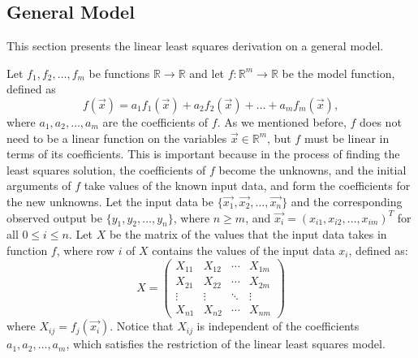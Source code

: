 \documentclass[11pt, oneside, reqno]{book}
\begin{document}




\subsection{General Model}
This section presents the linear least squares derivation on a general model.

Let $f_1, f_2, \dots, f_m$ be functions $\mathbb{R} \to \mathbb{R}$ and let $f: \mathbb{R}^m \to \mathbb{R}$ be the model function, defined as
\[
f(\vec{x}) = a_1f_1(\vec{x}) + a_2f_2(\vec{x}) + \dots + a_mf_m(\vec{x}),
\]
where $a_1, a_2, \dots, a_m$ are the coefficients of $f$.
As we mentioned before, $f$ does not need to be a linear function on the variables $\vec{x} \in \mathbb{R}^m$, but $f$ must be linear in terms of its coefficients. This is important because in the process of finding the least squares solution, the coefficients of $f$ become the unknowns, and the initial arguments of $f$ take values of the known input data, and form the coefficients for the new unknowns. Let the input data be $\{\vec{x_1}, \vec{x_2}, \dots, \vec{x_n}\}$ and the corresponding observed output be $\{y_1, y_2, \dots, y_n\}$, where $n \ge m$, and $\vec{x_i} = \left(x_{i1}, x_{i2}, \dots, x_{im}\right)^T$ for all $0 \le i \le n$. 
Let $X$ be the matrix of the values that the input data takes in function $f$, where row $i$ of $X$ contains the values of the input data $x_i$, defined as:
\[
X = \begin{pmatrix}
X_{11} & X_{12} & \cdots & X_{1m} \\
X_{21} & X_{22} & \cdots & X_{2m} \\
\vdots  & \vdots  & \ddots & \vdots  \\
X_{n1} & X_{n2} & \cdots & X_{nm}
\end{pmatrix}
\]
where $X_{ij} = f_j \left( \vec{x_i} \right) $. Notice that $X_{ij}$ is independent of the coefficients $a_1, a_2, \dots, a_m$, which satisfies the restriction of the linear least squares model. 
\end{document}
